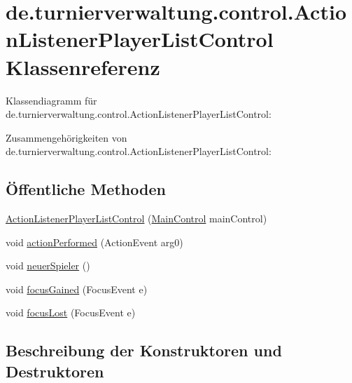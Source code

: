 \hypertarget{classde_1_1turnierverwaltung_1_1control_1_1_action_listener_player_list_control}{}\section{de.\+turnierverwaltung.\+control.\+Action\+Listener\+Player\+List\+Control Klassenreferenz}
\label{classde_1_1turnierverwaltung_1_1control_1_1_action_listener_player_list_control}


Klassendiagramm für de.\+turnierverwaltung.\+control.\+Action\+Listener\+Player\+List\+Control\+:


Zusammengehörigkeiten von de.\+turnierverwaltung.\+control.\+Action\+Listener\+Player\+List\+Control\+:
\subsection*{Öffentliche Methoden}
\begin{DoxyCompactItemize}
\item 
\hyperlink{classde_1_1turnierverwaltung_1_1control_1_1_action_listener_player_list_control_ac6b0e2428dc80c4a57b85500ea4509fb}{Action\+Listener\+Player\+List\+Control} (\hyperlink{classde_1_1turnierverwaltung_1_1control_1_1_main_control}{Main\+Control} main\+Control)
\item 
void \hyperlink{classde_1_1turnierverwaltung_1_1control_1_1_action_listener_player_list_control_a7a4d778a8bbb20f7453b544f94bc120e}{action\+Performed} (Action\+Event arg0)
\item 
void \hyperlink{classde_1_1turnierverwaltung_1_1control_1_1_action_listener_player_list_control_abb35c9d801b84ad8db91b5b0b5440936}{neuer\+Spieler} ()
\item 
void \hyperlink{classde_1_1turnierverwaltung_1_1control_1_1_action_listener_player_list_control_a46aa1a6bdf27b693ce6b7de0fe85b7dd}{focus\+Gained} (Focus\+Event e)
\item 
void \hyperlink{classde_1_1turnierverwaltung_1_1control_1_1_action_listener_player_list_control_a9e10ed9e133cd97cb18b42df74f96679}{focus\+Lost} (Focus\+Event e)
\end{DoxyCompactItemize}


\subsection{Beschreibung der Konstruktoren und Destruktoren}
